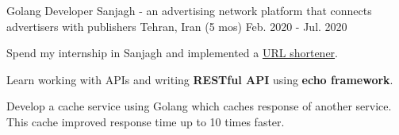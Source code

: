 \begin{cventries}
  \cventry
    {Golang Developer} %
    {Sanjagh - \textnormal{an advertising network platform that connects advertisers with publishers}} %
    {Tehran, Iran} %
    {(5 mos) Feb. 2020 - Jul. 2020} %
    {
      \begin{cvitems} %
        \item {Spend my internship in Sanjagh and implemented a \href{https://github.com/pooria1/url-shortener}{URL shortener}.}
        \item {Learn working with APIs and writing \textbf{RESTful API} using \textbf{echo framework}.}
        \item {Develop a cache service using Golang which caches response of another service. This cache improved response time up to 10 times faster.}
      \end{cvitems}
    }

\end{cventries}
